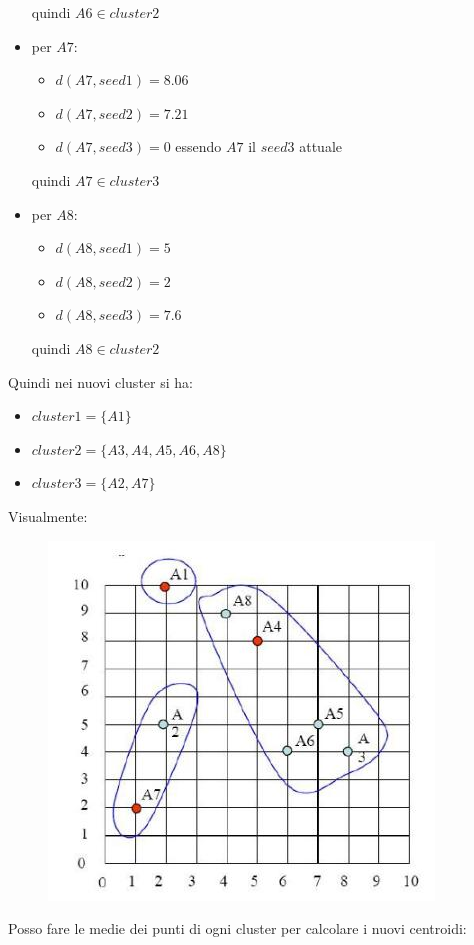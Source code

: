 \begin{esercizio}
\begin{itemize}
\begin{itemize}
    \end{itemize}
    quindi $A6\in cluster2$
    \item per $A7$:
    \begin{itemize}
      \item $d(A7, seed1)=8.06$ 
      \item $d(A7, seed2)=7.21$ 
      \item $d(A7, seed3)=0$ essendo $A7$ il $seed3$ attuale
    \end{itemize}
    quindi $A7\in cluster3$
    \item per $A8$:
    \begin{itemize}
      \item $d(A8, seed1)=5$ 
      \item $d(A8, seed2)=2$
      \item $d(A8, seed3)=7.6$
    \end{itemize}
    quindi $A8\in cluster2$
  \end{itemize}
  Quindi nei nuovi cluster si ha:
  \begin{itemize}
    \item $cluster1=\{A1\}$
    \item $cluster2=\{A3, A4, A5, A6, A8\}$
    \item $cluster3=\{A2, A7\}$
  \end{itemize}
  Visualmente:
  \begin{figure}[H]
    \centering
    \includegraphics[scale = 0.4]{img/clue2.jpg}
  \end{figure}
  Posso fare le medie dei punti di ogni cluster per calcolare i nuovi
  centroidi: 
  \begin{itemize}

\end{itemize}
\end{esercizio}
